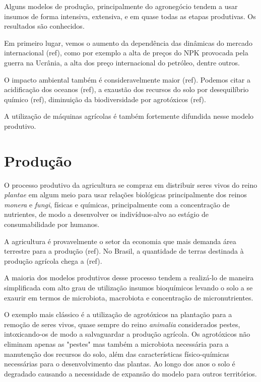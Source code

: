 \documentclass[]{article}
\begin{document}
Alguns modelos de produção, principalmente do agronegócio tendem a usar insumos de forma intensiva, extensiva, e em quase todas as etapas produtivas. Os resultados são conhecidos. 

Em primeiro lugar, vemos o aumento da dependência das dinâmicas do mercado internacional (ref), como por exemplo a alta de preços do NPK provocada pela guerra na Ucrânia, a alta dos preço internacional do petróleo, dentre outros.

O impacto ambiental também é consideravelmente maior (ref). Podemos citar a acidificação dos oceanos (ref), a exaustão dos recursos do solo por desequilíbrio químico (ref), diminuição da biodiversidade por agrotóxicos (ref).

A utilização de máquinas agrícolas é também fortemente difundida nesse modelo produtivo. 




\section{Produção}

O processo produtivo da agricultura se compraz em distribuir seres vivos do reino \textit{plantae} em algum meio para usar relações biológicas principalmente dos reinos \textit{monera} e \textit{fungi}, físicas e químicas, principalmente com a concentração de nutrientes, de modo a desenvolver os indivíduos-alvo ao estágio de consumabilidade por humanos. 

A agricultura é provavelmente o setor da economia que mais demanda área terrestre para a produção (ref). No Brasil, a quantidade de terras destinada à produção agrícola chega a (ref). 

A maioria dos modelos produtivos desse processo tendem a realizá-lo de maneira simplificada com alto grau de utilização insumos bioquímicos levando o solo a se exaurir em termos de microbiota, macrobiota e concentração de micronutrientes. 

O exemplo mais clássico é a utilização de agrotóxicos na plantação para a remoção de seres vivos, quase sempre do reino \textit{animalia} considerados pestes, intoxicando-os de modo a salvaguardar a produção agrícola. Os agrotóxicos não eliminam apenas as "pestes" mas também a microbiota necessária para a manutenção dos recursos do solo, além das características físico-químicas necessárias para o desenvolvimento das plantas. Ao longo dos anos o solo é degradado causando a necessidade de expansão do modelo para outros territórios.
\end{document}
